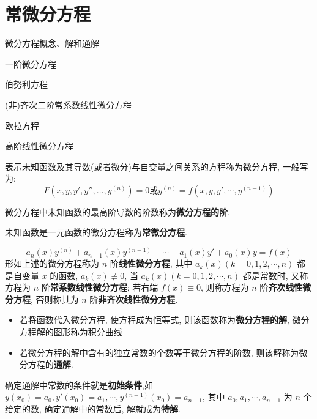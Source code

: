 \chapter{常微分方程}
\begin{introduction}
	\item 微分方程概念、解和通解
	\item 一阶微分方程
	\item 伯努利方程
	\item (非)齐次二阶常系数线性微分方程
	\item 欧拉方程
	\item 高阶线性微分方程
\end{introduction}
\begin{definition}[微分方程及其阶]
	表示未知函数及其导数(或者微分)与自变量之间关系的方程称为微分方程, 一般写为:
	$$F(x,y,y',y'',\dots,y^{(n)})=0\text{或} y^{(n)} = f(x,y,y',\cdots,y^{(n-1)})$$
	
	微分方程中未知函数的最高阶导数的阶数称为\textbf{微分方程的阶}.
\end{definition}

\begin{definition}[常微分方程]
	未知函数是一元函数的微分方程称为\textbf{常微分方程}.
\end{definition}

\begin{definition}[线性微分方程]
	$$a_{n}(x)y^{(n)} + a_{n-1}(x)y^{(n-1)} + \cdots + a_{1}(x)y' + a_{0}(x) y = f(x)$$
	形如上述的微分方程称为 $n$ 阶\textbf{线性微分方程}, 其中 $a_{k}(x)(k=0,1,2,\cdots,n)$ 都是自变量 $x$ 的函数, $a_{k}(x)\not\equiv 0$, 当 $a_{k}(x)(k=0,1,2,\cdots,n)$ 都是常数时,
	又称方程为 $n$ 阶\textbf{常系数线性微分方程}; 若右端 $f(x)\equiv 0$, 则称方程为 $n$ 阶\textbf{齐次线性微分方程}, 否则称其为 $n$ 阶\textbf{非齐次线性微分方程}.
\end{definition}
\begin{definition}[微分方程的解和通解]
	\begin{itemize}
		\item 若将函数代入微分方程, 使方程成为恒等式, 则该函数称为\textbf{微分方程的解}, 微分方程解的图形称为积分曲线
		\item 若微分方程的解中含有的独立常数的个数等于微分方程的阶数, 则该解称为微分方程的\textbf{通解}.
	\end{itemize}
\end{definition}
\begin{definition}[初始条件和特解]
	确定通解中常数的条件就是\textbf{初始条件},如 $y(x_{0})=a_{0},y'(x_{0})=a_{1},\cdots,y^{(n-1)}(x_{0})=a_{n-1}$,
	其中 $a_{0},a_{1},\cdots,a_{n-1}$ 为 $n$ 个给定的数, 确定通解中的常数后, 解就成为\textbf{特解}.
\end{definition}

